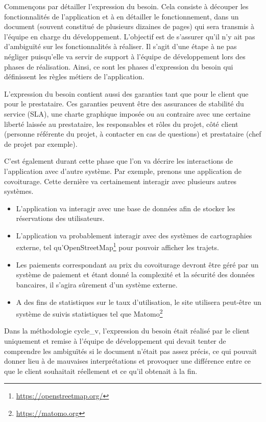 Commençons par détailler l'expression du besoin. Cela consiste à découper les fonctionnalités de l'application et à en détailler le fonctionnement, dans un document (souvent constitué de plusieurs dizaines de pages) qui sera transmis à l'équipe en charge du développement. L'objectif est de s'assurer qu'il n'y ait pas d'ambiguïté sur les fonctionnalités à réaliser. Il s'agit d'une étape à ne pas négliger puisqu'elle va servir de support à l'équipe de développement lors des phases de réalisation. Ainsi, ce sont les phases d'expression du besoin qui définissent les règles métiers de l'application. 

L'expression du besoin contient aussi des garanties tant que pour le client que pour le prestataire. Ces garanties peuvent être des assurances de stabilité du service (\gls{SLA}), une charte graphique imposée ou au contraire avec une certaine liberté laissée au prestataire, les responsables et rôles du projet, côté client (personne référente du projet, à contacter en cas de questions) et prestataire (chef de projet par exemple).

C'est également durant cette phase que l'on va décrire les interactions de l'application avec d'autre système. Par exemple, prenons une application de covoiturage. Cette dernière va certainement interagir avec plusieurs autres systèmes.

\begin{itemize}
	\setlength\itemsep{0em}
	\item L'application va interagir avec une base de données afin de stocker les réservations des utilisateurs.
	\item L'application va probablement interagir avec des systèmes de cartographies externe, tel qu'OpenStreetMap\footnote{\url{https://openstreetmap.org/}} pour pouvoir afficher les trajets.
	\item Les paiements correspondant au prix du covoiturage devront être géré par un système de paiement et étant donné la complexité et la sécurité des données bancaires, il s'agira sûrement d'un système externe.
	\item A des fins de statistiques sur le taux d'utilisation, le site utilisera peut-être un système de suivis statistiques tel que Matomo\footnote{\url{https://matomo.org}} 
\end{itemize}

Dans la méthodologie \gls{cycle_v}, l'expression du besoin était réalisé par le client uniquement et remise à l'équipe de développement qui devait tenter de comprendre les ambiguïtés si le document n'était pas assez précis, ce qui pouvait donner lieu à de mauvaises interprétations et provoquer une différence entre ce que le client souhaitait réellement et ce qu'il obtenait à la fin. 

